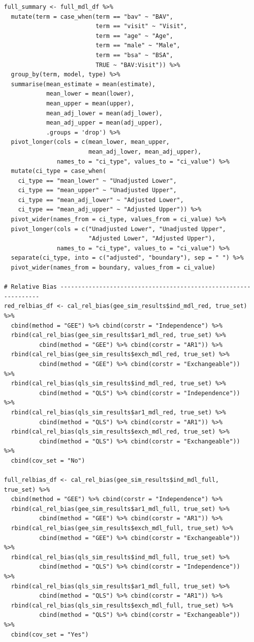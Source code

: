 \documentclass[
]{aft}
\begin{document}
\begin{verbatim}
full_summary <- full_mdl_df %>%
  mutate(term = case_when(term == "bav" ~ "BAV",
                          term == "visit" ~ "Visit",
                          term == "age" ~ "Age",
                          term == "male" ~ "Male",
                          term == "bsa" ~ "BSA",
                          TRUE ~ "BAV:Visit")) %>%
  group_by(term, model, type) %>%
  summarise(mean_estimate = mean(estimate),
            mean_lower = mean(lower),
            mean_upper = mean(upper),
            mean_adj_lower = mean(adj_lower),
            mean_adj_upper = mean(adj_upper),
            .groups = 'drop') %>%
  pivot_longer(cols = c(mean_lower, mean_upper, 
                        mean_adj_lower, mean_adj_upper),
               names_to = "ci_type", values_to = "ci_value") %>%
  mutate(ci_type = case_when(
    ci_type == "mean_lower" ~ "Unadjusted Lower",
    ci_type == "mean_upper" ~ "Unadjusted Upper",
    ci_type == "mean_adj_lower" ~ "Adjusted Lower",
    ci_type == "mean_adj_upper" ~ "Adjusted Upper")) %>%
  pivot_wider(names_from = ci_type, values_from = ci_value) %>%
  pivot_longer(cols = c("Unadjusted Lower", "Unadjusted Upper",
                        "Adjusted Lower", "Adjusted Upper"),
               names_to = "ci_type", values_to = "ci_value") %>%
  separate(ci_type, into = c("adjusted", "boundary"), sep = " ") %>%
  pivot_wider(names_from = boundary, values_from = ci_value)

# Relative Bias ----------------------------------------------------------------
red_relbias_df <- cal_rel_bias(gee_sim_results$ind_mdl_red, true_set) %>% 
  cbind(method = "GEE") %>% cbind(corstr = "Independence") %>% 
  rbind(cal_rel_bias(gee_sim_results$ar1_mdl_red, true_set) %>% 
          cbind(method = "GEE") %>% cbind(corstr = "AR1")) %>% 
  rbind(cal_rel_bias(gee_sim_results$exch_mdl_red, true_set) %>% 
          cbind(method = "GEE") %>% cbind(corstr = "Exchangeable")) %>% 
  rbind(cal_rel_bias(qls_sim_results$ind_mdl_red, true_set) %>% 
          cbind(method = "QLS") %>% cbind(corstr = "Independence")) %>% 
  rbind(cal_rel_bias(qls_sim_results$ar1_mdl_red, true_set) %>% 
          cbind(method = "QLS") %>% cbind(corstr = "AR1")) %>% 
  rbind(cal_rel_bias(qls_sim_results$exch_mdl_red, true_set) %>% 
          cbind(method = "QLS") %>% cbind(corstr = "Exchangeable")) %>% 
  cbind(cov_set = "No")

full_relbias_df <- cal_rel_bias(gee_sim_results$ind_mdl_full, true_set) %>% 
  cbind(method = "GEE") %>% cbind(corstr = "Independence") %>% 
  rbind(cal_rel_bias(gee_sim_results$ar1_mdl_full, true_set) %>% 
          cbind(method = "GEE") %>% cbind(corstr = "AR1")) %>% 
  rbind(cal_rel_bias(gee_sim_results$exch_mdl_full, true_set) %>% 
          cbind(method = "GEE") %>% cbind(corstr = "Exchangeable")) %>% 
  rbind(cal_rel_bias(qls_sim_results$ind_mdl_full, true_set) %>% 
          cbind(method = "QLS") %>% cbind(corstr = "Independence")) %>% 
  rbind(cal_rel_bias(qls_sim_results$ar1_mdl_full, true_set) %>% 
          cbind(method = "QLS") %>% cbind(corstr = "AR1")) %>% 
  rbind(cal_rel_bias(qls_sim_results$exch_mdl_full, true_set) %>% 
          cbind(method = "QLS") %>% cbind(corstr = "Exchangeable")) %>% 
  cbind(cov_set = "Yes")


\end{verbatim}
\end{document}
